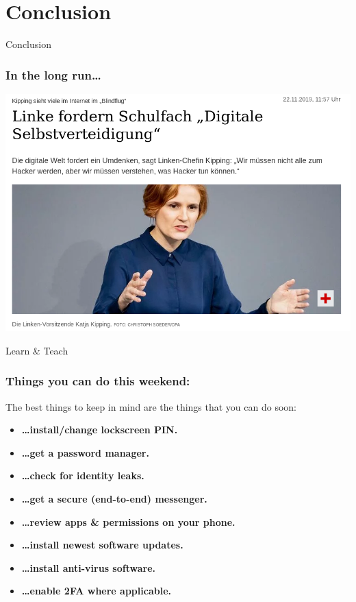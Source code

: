 \documentclass[aspectratio=169,dvipsnames]{beamer}
\begin{document}


\section{Conclusion}
\begin{frame}
\begin{center}
\huge Conclusion
\end{center}
\end{frame}

\begin{frame}
\frametitle{In the long run\dots}
\begin{center}
\includegraphics[scale=0.25]{images/kipping.png}
\bigskip

\Large
Learn \& Teach
\end{center}
\end{frame}

\begin{frame}
\frametitle{Things you can do this weekend:}

The best things to keep in mind are the things that you can do soon:
\bigskip

\begin{itemize}
\pause\item\textbf{\dots install/change lockscreen PIN.}
\pause\item\textbf{\dots get a password manager.}
\pause\item\textbf{\dots check for identity leaks.}
\pause\item\textbf{\dots get a secure (end-to-end) messenger.}
\pause\item\textbf{\dots review apps \& permissions on your phone.}
\pause\item\textbf{\dots install newest software updates.}
\pause\item\textbf{\dots install anti-virus software.}\\
\pause\item\textbf{\dots enable 2FA where applicable.}
\end{itemize}
\end{frame}
\end{document}
